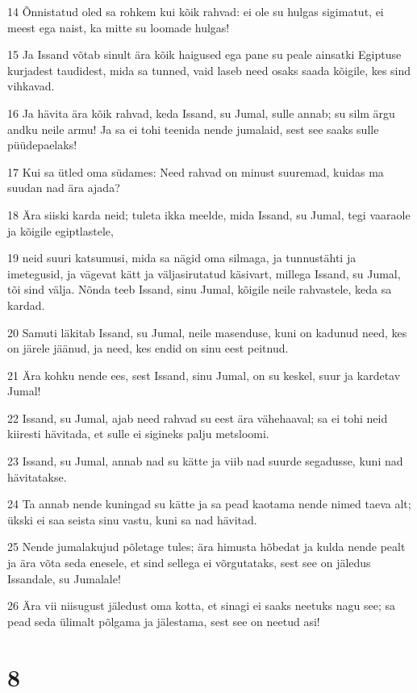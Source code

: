 \par 14 Õnnistatud oled sa rohkem kui kõik rahvad: ei ole su hulgas sigimatut, ei meest ega naist, ka mitte su loomade hulgas!
\par 15 Ja Issand võtab sinult ära kõik haigused ega pane su peale ainsatki Egiptuse kurjadest taudidest, mida sa tunned, vaid laseb need osaks saada kõigile, kes sind vihkavad.
\par 16 Ja hävita ära kõik rahvad, keda Issand, su Jumal, sulle annab; su silm ärgu andku neile armu! Ja sa ei tohi teenida nende jumalaid, sest see saaks sulle püüdepaelaks!
\par 17 Kui sa ütled oma südames: Need rahvad on minust suuremad, kuidas ma suudan nad ära ajada?
\par 18 Ära siiski karda neid; tuleta ikka meelde, mida Issand, su Jumal, tegi vaaraole ja kõigile egiptlastele,
\par 19 neid suuri katsumusi, mida sa nägid oma silmaga, ja tunnustähti ja imetegusid, ja vägevat kätt ja väljasirutatud käsivart, millega Issand, su Jumal, tõi sind välja. Nõnda teeb Issand, sinu Jumal, kõigile neile rahvastele, keda sa kardad.
\par 20 Samuti läkitab Issand, su Jumal, neile masenduse, kuni on kadunud need, kes on järele jäänud, ja need, kes endid on sinu eest peitnud.
\par 21 Ära kohku nende ees, sest Issand, sinu Jumal, on su keskel, suur ja kardetav Jumal!
\par 22 Issand, su Jumal, ajab need rahvad su eest ära vähehaaval; sa ei tohi neid kiiresti hävitada, et sulle ei sigineks palju metsloomi.
\par 23 Issand, su Jumal, annab nad su kätte ja viib nad suurde segadusse, kuni nad hävitatakse.
\par 24 Ta annab nende kuningad su kätte ja sa pead kaotama nende nimed taeva alt; ükski ei saa seista sinu vastu, kuni sa nad hävitad.
\par 25 Nende jumalakujud põletage tules; ära himusta hõbedat ja kulda nende pealt ja ära võta seda enesele, et sind sellega ei võrgutataks, sest see on jäledus Issandale, su Jumalale!
\par 26 Ära vii niisugust jäledust oma kotta, et sinagi ei saaks neetuks nagu see; sa pead seda ülimalt põlgama ja jälestama, sest see on neetud asi!

\chapter{8}

